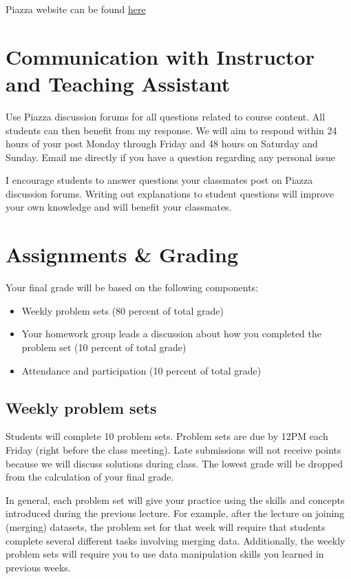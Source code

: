 \documentclass[11pt,]{article}
\providecommand{\tightlist}{%
  \setlength{\itemsep}{0pt}\setlength{\parskip}{0pt}}
\begin{document}
Piazza website can be found
\href{https://piazza.com/class/jlo6477nzqo2j0}{here}

\section{Communication with Instructor and Teaching
Assistant}\label{communication-with-instructor-and-teaching-assistant}

Use Piazza discussion forums for all questions related to course
content. All students can then benefit from my response. We will aim to
respond within 24 hours of your post Monday through Friday and 48 hours
on Saturday and Sunday. Email me directly if you have a question
regarding any personal issue

I encourage students to answer questions your classmates post on Piazza
discussion forums. Writing out explanations to student questions will
improve your own knowledge and will benefit your classmates.

\section{Assignments \& Grading}\label{assignments-grading}

Your final grade will be based on the following components:

\begin{itemize}
\tightlist
\item
  Weekly problem sets (80 percent of total grade)
\item
  Your homework group leads a discussion about how you completed the
  problem set (10 percent of total grade)
\item
  Attendance and participation (10 percent of total grade)
\end{itemize}

\subsection{Weekly problem sets}\label{weekly-problem-sets}

Students will complete 10 problem sets. Problem sets are due by 12PM
each Friday (right before the class meeting). Late submissions will not
receive points because we will discuss solutions during class. The
lowest grade will be dropped from the calculation of your final grade.

In general, each problem set will give your practice using the skills
and concepts introduced during the previous lecture. For example, after
the lecture on joining (merging) datasets, the problem set for that week
will require that students complete several different tasks involving
merging data. Additionally, the weekly problem sets will require you to
use data manipulation skills you learned in previous weeks.
\end{document}
